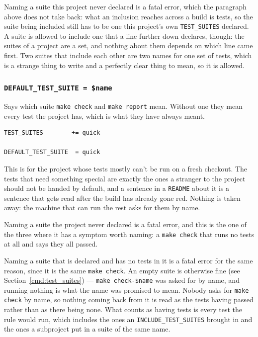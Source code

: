 \documentclass{article}
\begin{document}
Naming a suite this project never declared is a fatal error, which the
paragraph above does not take back: what an inclusion reaches across a
build is tests, so the suite being included still has to be one this
project's own \texttt{TEST\_SUITES} declared.  A suite is allowed to
include one that a line further down declares, though:
the suites of a project are a set, and nothing about them depends on
which line came first.  Two suites that include each other are two
names for one set of tests, which is a strange thing to write and a
perfectly clear thing to mean, so it is allowed.

\subsubsection{\texttt{DEFAULT\_TEST\_SUITE = \$name}
              \label{cmd:default_test_suite}}

Says which suite \texttt{make check} and \texttt{make report} mean.
Without one they mean every test the project has, which is what they
have always meant.

\begin{verbatim}
TEST_SUITES        += quick

DEFAULT_TEST_SUITE  = quick
\end{verbatim}

This is for the project whose tests mostly can't be run on a fresh
checkout.  The tests that need something special are exactly the ones
a stranger to the project should not be handed by default, and a
sentence in a \texttt{README} about it is a sentence that gets read
after the build has already gone red.  Nothing is taken away: the
machine that can run the rest asks for them by name.

Naming a suite the project never declared is a fatal error, and this
is the one of the three where it has a symptom worth naming: a
\texttt{make check} that runs no tests at all and says they all
passed.

Naming a suite that is declared and has no tests in it is a fatal
error for the same reason, since it is the same \texttt{make check}.
An empty suite is otherwise fine (see
Section~\ref{cmd:test_suites}) --- \texttt{make check-\$name} was
asked for by name, and running nothing is what the name was promised
to mean.  Nobody asks for \texttt{make check} by name, so nothing
coming back from it is read as the tests having passed rather than as
there being none.  What counts as having tests is every test the rule
would run, which includes the ones an
\texttt{INCLUDE\_TEST\_SUITES} brought in and the ones a subproject
put in a suite of the same name.
\end{document}
